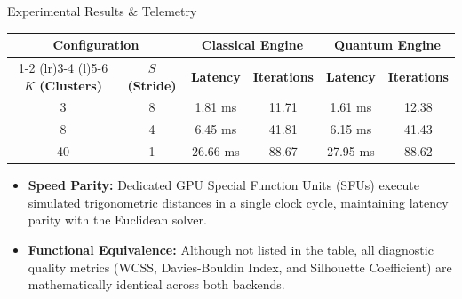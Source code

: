 \documentclass[11pt]{beamer}
\begin{document}
\begin{frame}{Experimental Results \& Telemetry}
    \begin{table}[h]
        \centering
        \footnotesize
        \begin{tabular}{cccccc}
            \toprule
            \multicolumn{2}{c}{\textbf{Configuration}} & \multicolumn{2}{c}{\textbf{Classical Engine}} & \multicolumn{2}{c}{\textbf{Quantum Engine}} \\
            \cmidrule(r){1-2} \cmidrule(lr){3-4} \cmidrule(l){5-6}
            \textbf{$K$ (Clusters)} & \textbf{$S$ (Stride)} & \textbf{Latency} & \textbf{Iterations} & \textbf{Latency} & \textbf{Iterations} \\
            \midrule
            3  & 8  & 1.81 ms  & 11.71  & 1.61 ms  & 12.38  \\
            8  & 4  & 6.45 ms  & 41.81  & 6.15 ms  & 41.43  \\
            40 & 1  & 26.66 ms & 88.67  & 27.95 ms & 88.62  \\
            \bottomrule
        \end{tabular}
    \end{table}
    
    \begin{itemize}
        \item \textbf{Speed Parity:} Dedicated GPU Special Function Units (SFUs) execute simulated trigonometric distances in a single clock cycle, maintaining latency parity with the Euclidean solver.
        \item \textbf{Functional Equivalence:} Although not listed in the table, all diagnostic quality metrics (WCSS, Davies-Bouldin Index, and Silhouette Coefficient) are mathematically identical across both backends.
    \end{itemize}
\end{frame}
\end{document}
